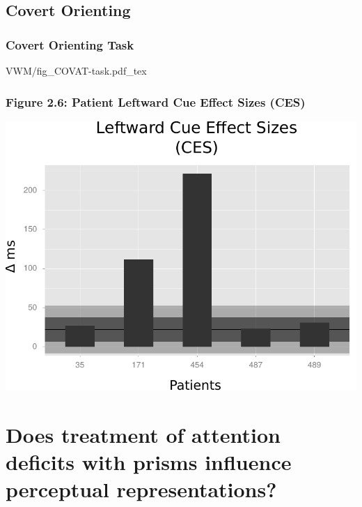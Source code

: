 \documentclass{beamer}
\begin{document}
\subsection*{Covert Orienting}
\begin{frame}
	\frametitle{Covert Orienting Task}
	\def\svgwidth{1\textwidth}
	{VWM/fig_COVAT-task.pdf_tex}
\end{frame}


\subsection*{}

\section[Prisms]{Does treatment of attention deficits with prisms influence perceptual representations?}
\end{document}
